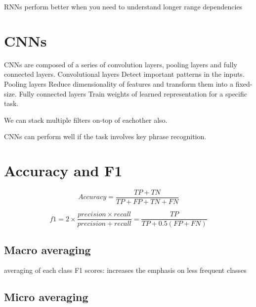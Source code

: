 \documentclass[11pt]{article}
\begin{document}
\begin{warning}
    RNNs perform better when you need to understand longer range dependencies
\end{warning}

\section{CNNs}

CNNs are composed of a series of convolution layers,
pooling layers and fully connected layers. Convolutional layers Detect important patterns in the inputs. Pooling layers Reduce dimensionality of features and transform them into a fixed-size. Fully connected layers Train weights of learned representation for a specific task.

We can stack multiple filters on-top of eachother also.

\begin{warning}
    CNNs can perform well if the task involves key phrase recognition.
\end{warning}

\section{Accuracy and F1}

\begin{definition}[accuracy]
    \begin{equation*}
        Accuracy = \frac{TP + TN}{TP +FP + TN + FN}
    \end{equation*}
\end{definition}

\begin{definition}[f1-measure]
    \begin{equation*}
        f1 = 2 \times \frac{precision\times recall}{precision + recall} = \frac{TP}{TP + 0.5 (FP +FN)}
    \end{equation*}
\end{definition}

\subsection{Macro averaging}

averaging of each class F1 scores: increases the emphasis on less frequent classes

\subsection{Micro averaging}
\end{document}
